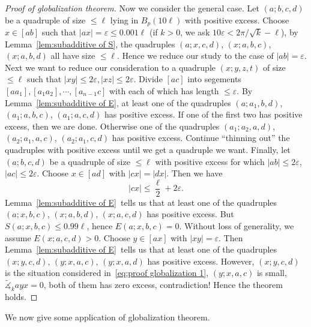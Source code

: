 \begin{proof}[Proof of globalization theorem]
    Now we consider the general case.
    Let $(a;b,c,d)$ be a quadruple of size $\leq\ell$ lying in $B_p(10\ell)$ with positive excess.
    Choose $x\in[ab]$ such that $|ax|=\varepsilon\leq 0.001\ell$ (if $k>0$, we ask $10\varepsilon<2\pi/\sqrt{k}-\ell$), by Lemma~\ref{lem:subadditive of S}, the quadruples $(a;x,c,d)$, $(x;a,b,c)$, $(x;a,b,d)$ all have size $\leq\ell$.
    Hence we reduce our study to the case of $|ab|=\varepsilon$.
    Next we want to reduce our consideration to a quadruple $(x;y,z,t)$ of size $\leq\ell$ such that $|xy|\leq 2\varepsilon,|xz|\leq 2\varepsilon$.
    Divide $[ac]$ into segements $[aa_1],[a_1a_2],\cdots,[a_{n-1}c]$ with each of which has length $\leq\varepsilon$.
    By Lemma~\ref{lem:subadditive of E}, at least one of the quadruples $(a;a_1,b,d)$, $(a_1;a,b,c)$, $(a_1;a,c,d)$ has positive excess.
    If one of the first two has positive excess, then we are done.
    Otherwise one of the quadruples $(a_1;a_2,a,d)$, $(a_2;a_1,a,c)$, $(a_2;a_1,c,d)$ has positive excess.
    Continue ``thinning out'' the quadruples with positive excess until we get a quadruple we want.
    Finally, let $(a;b,c,d)$ be a quadruple of size $\leq\ell$ with positive excess for which $|ab|\leq 2\varepsilon$, $|ac|\leq 2\varepsilon$.
    Choose $x\in[ad]$ with $|cx|=|dx|$.
    Then we have
    \[|cx|\leq\frac{\ell}{2}+2\varepsilon.\]
    Lemma~\ref{lem:subadditive of E}~tells us that at least one of the quadruples $(a;x,b,c)$, $(x;a,b,d)$, $(x;a,c,d)$ has positive excess.
    But $S(a;x,b,c)\leq 0.99\ell$, hence $E(a;x,b,c)=0$.
    Without loss of generality, we assume $E(x;a,c,d)>0$.
    Choose $y\in[ax]$ with $|xy|=\varepsilon$.
    Then Lemma~\ref{lem:subadditive of E}~tells us that at least one of the quadruples $(x;y,c,d)$, $(y;x,a,c)$, $(y;x,a,d)$ has positive excess.
    However, $(x;y,c,d)$ is the situation considered in~\eqref{eq:proof globalization 1}, $(y;x,a,c)$ is small, $\tilde{\measuredangle}_kayx=0$, both of them has zero excess, contradiction!
    Hence the theorem holds.
\end{proof}

We now give some application of globalization theorem.

